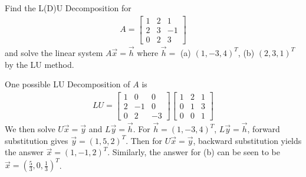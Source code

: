 \begin{Exercise}
Find the L(D)U Decomposition for
\begin{align*}
A = 
\begin{bmatrix}
1 & 2 & 1 \\
2 & 3 & -1 \\
0 & 2 & 3
\end{bmatrix}
\end{align*}
and solve the linear system $A\vec{x} = \vec{h}$ where $\vec{h} =$ (a) $(1,-3,4)^T$, (b) $(2,3,1)^T$ by the LU method.
\end{Exercise}
\begin{Answer}
One possible LU Decomposition of $A$ is
\begin{align*}
LU = \begin{bmatrix}
1&0&0\\ 
2&-1&0\\ 
0&2&-3
\end{bmatrix}
\begin{bmatrix}
1&2&1\\ 
0&1&3\\ 
0&0&1
\end{bmatrix}
\end{align*}
We then solve $U\vec{x} = \vec{y}$ and $L\vec{y} = \vec{h}$. For $\vec{h} = (1,-3,4)^T$, $L\vec{y} = \vec{h}$, forward substitution gives $\vec{y} = (1,5,2)^T$. Then for $U\vec{x} = \vec{y}$, backward substitution yields the answer $\vec{x} = (1,-1,2)^T$. Similarly, the answer for (b) can be seen to be $\vec{x} = (\frac{5}{3}, 0, \frac{1}{3})^T$.
\end{Answer}

